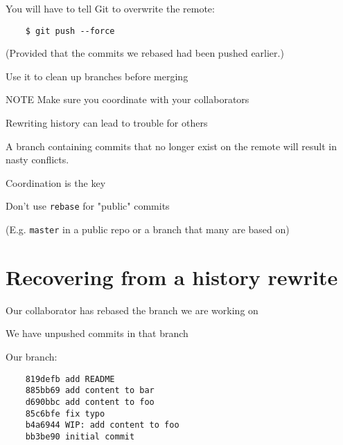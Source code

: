 \documentclass[11pt,xetex]{beamer}
\begin{document}
\begin{frame}[fragile]{}
  \Large
  You will have to tell Git to overwrite the remote:

  \begin{verbatim}
    $ git push --force
  \end{verbatim}

  \normalsize
  (Provided that the commits we rebased had been pushed earlier.)
\end{frame}

\begin{frame}{}
  \LARGE
  Use it to clean up branches before merging
\end{frame}

\begin{frame}{}
  \begin{alertblock}{\Huge NOTE}
    \Large
    Make sure you coordinate with your collaborators
  \end{alertblock}
\end{frame}

\begin{frame}{}
  \LARGE
  Rewriting history can lead to trouble for others
  \pause

  \normalsize
  A branch containing commits that no longer exist on the remote will
  result in nasty conflicts.
\end{frame}

\begin{frame}{}
  \Huge Coordination is the key
\end{frame}

\begin{frame}[fragile]{}
  \LARGE
  Don't use \texttt{rebase} for "public" commits
  \pause

  \large
  (E.g. \texttt{master} in a public repo or a branch that
  many are based on)
\end{frame}

\section*{Recovering from a history rewrite}

\begin{frame}{}
  \Large
  Our collaborator has rebased the branch we are working on
  \pause

  We have unpushed commits in that branch
\end{frame}

\begin{frame}[fragile]{}
  \Large
  Our branch:

  \begin{verbatim}
    819defb add README
    885bb69 add content to bar
    d690bbc add content to foo
    85c6bfe fix typo
    b4a6944 WIP: add content to foo
    bb3be90 initial commit
  \end{verbatim}
\end{frame}
\end{document}
